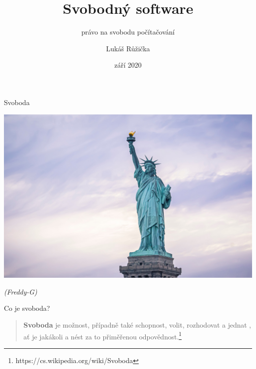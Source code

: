 \documentclass[11pt]{beamer}
\begin{document}
	\author{Lukáš Růžička}
	\title{Svobodný software}
	\subtitle{právo na svobodu počítačování}
	\date{září 2020}
	\begin{frame}[plain]
		\maketitle
	\end{frame}

	\begin{frame}{Svoboda}
	 \begin{center}
	 	\includegraphics[width=\textwidth]{images/statue_of_liberty.jpg}
	 \end{center}
     \begin{flushright}
     	\textit{(Freddy-G)}
     \end{flushright}
 
	\end{frame}

	\begin{frame}{Co je svoboda?}
		\begin{quote}
			\textbf{Svoboda} je možnost, případně také schopnost, volit, rozhodovat a jednat , ať je jakákoli a nést za to přiměřenou odpovědnost.\footnote{https://cs.wikipedia.org/wiki/Svoboda} 
		\end{quote}
	\end{frame}
	
\end{document}
